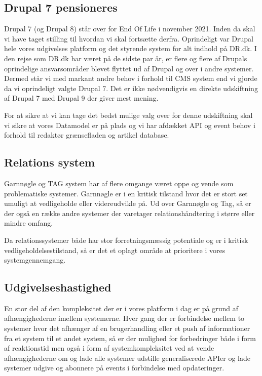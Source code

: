 \documentclass{article}
\begin{document}
\subsection{Drupal 7 pensioneres}
Drupal 7 (og Drupal 8) står over for End Of Life i november 2021. Inden da skal vi have taget stilling til hvordan vi skal fortsætte derfra.
Oprindeligt var Drupal hele vores udgivelses platform og det styrende system for alt indhold på DR.dk. I den rejse som DR.dk har været på de sidste par år, er flere og flere af Drupals oprindelige ansvarsområder blevet flyttet ud af Drupal og over i andre systemer. Dermed står vi med markant andre behov i forhold til CMS system end vi gjorde da vi oprindeligt valgte Drupal 7. Det er ikke nødvendigvis en direkte udskiftning af Drupal 7 med Drupal 9 der giver mest mening. 

For at sikre at vi kan tage det bedst mulige valg over for denne udskiftning skal vi sikre at vores Datamodel er på plads og vi har afdækket API og event behov i forhold til redaktør grænsefladen og artikel database. 

\subsection{Relations system}
Garnnøgle og TAG system har af flere omgange været oppe og vende som problematiske systemer. Garnnøgle er i en kritisk tilstand hvor det er stort set umuligt at vedligeholde eller videreudvikle på. Ud over Garnnøgle og Tag, så er der også en række andre systemer der varetager relationshåndtering i større eller mindre omfang.

Da relationssystemer både har stor forretningsmæssig potentiale og er i kritisk vedligeholdelsestilstand, så er det et oplagt område at prioritere i vores systemgennemgang.

\subsection{Udgivelseshastighed}
En stor del af den kompleksitet der er i vores platform i dag er på grund af afhængighederne imellem systemerne. Hver gang der er forbindelse mellem to systemer hvor det afhænger af en brugerhandling eller et push af informationer fra et system til et andet system, så er der mulighed for forbedringer både i form af reaktionstid men også i form af systemkompleksitet ved at vende afhængighederne om og lade alle systemer udstille generaliserede APIer og lade systemer udgive og abonnere på events i forbindelse med opdateringer.
\end{document}
